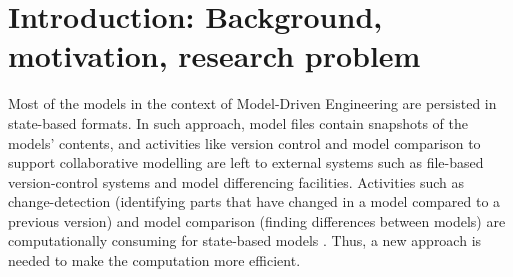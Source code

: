 \documentclass[sigplan,review,anonymous]{acmart}\settopmatter{printfolios=true,printccs=false,printacmref=false}
\begin{document}




\maketitle


\section{Introduction: Background, motivation, research problem}
\label{ch:introduction}

Most of the models in the context of Model-Driven Engineering are persisted in state-based formats. In such approach, model files contain snapshots of the models' contents, and activities like version control and model comparison to support collaborative modelling are left to external systems such as file-based version-control systems and model differencing facilities. Activities such as change-detection (identifying parts that have changed in a model compared to a previous version) and model comparison (finding differences between models) are computationally consuming for state-based models \cite{Kolovos:2009:DMM:1564596.1564641}. Thus, a new approach is needed to make the computation more efficient.
\end{document}
